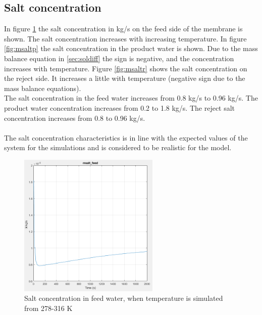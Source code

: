 \subsection{Salt concentration}
In figure \ref{fig:msaltf} the salt concentration in kg/s on the feed side of the membrane is shown. The salt concentration increases with increasing temperature. In figure \ref{fig:msaltp} the salt concentration in the product water is shown. Due to the mass balance equation in \ref{sec:soldiff} the sign is negative, and the concentration increases with temperature. Figure \ref{fig:msaltr} shows the salt concentration on the reject side. It increases a little with temperature (negative sign due to the mass balance equations).\\
The salt concentration in the feed water increases from 0.8 kg/s to 0.96 kg/s. The product water concentration increases from 0.2 to 1.8 kg/s. The reject salt concentration increases from 0.8 to 0.96 kg/s.\\
\\
The salt concentration characteristics is in line with the expected values of the system for the simulations and is considered to be realistic for the model. 
\begin{figure}[H]
\centering
    \includegraphics[width=0.6\textwidth]{msalt_feed.PNG}
    \caption{Salt concentration in feed water, when temperature is simulated from 278-316 K}
    \label{fig:msaltf}
\end{figure}

